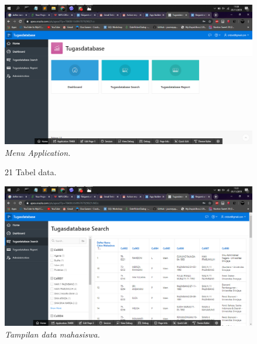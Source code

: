 \begin{enumerate}
\begin{figure}
    \begin{center}
\includegraphics[scale=0.2]{figures/19.png}
    \caption{\textit{Menu Application.}}
        \end{center}
\label{gambar}
\end{figure}

\begin{figure}
\item[21]Tabel data.
    \begin{center}
\includegraphics[scale=0.2]{figures/20.png} 
    \caption{\textit{Tampilan data mahasiswa.}}
        \end{center}
\label{gambar}
\end{figure}
\end{enumerate}
